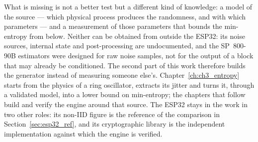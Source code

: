 What is missing is not a better test but a different kind of knowledge:
a model of the source --- which physical process produces the randomness,
and with which parameters --- and a measurement of those parameters that
bounds the min-entropy from below. Neither can be obtained from outside
the ESP32: its noise sources, internal state and post-processing are
undocumented, and the SP~800-90B estimators were designed for raw noise
samples, not for the output of a block that may already be conditioned.
The second part of this work therefore builds the generator instead of
measuring someone else's. Chapter~\ref{ch:ch3_entropy} starts from the
physics of a ring oscillator, extracts its jitter and turns it, through a
validated model, into a lower bound on min-entropy; the chapters that
follow build and verify the engine around that source. The ESP32 stays
in the work in two other roles: its non-IID figure is the reference of
the comparison in Section~\ref{sec:esp32_ref}, and its cryptographic
library is the independent implementation against which the engine is
verified.

